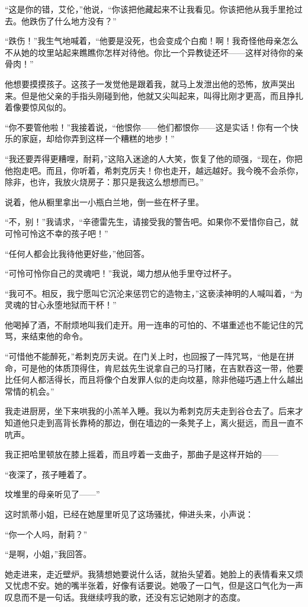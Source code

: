 \par “这是你的错，艾伦，”他说，“你该把他藏起来不让我看见。你该把他从我手里抢过去。他跌伤了什么地方没有？”
\par “跌伤！”我生气地喊着，“他要是没死，也会变成个白痴！啊！我奇怪他母亲怎么不从她的坟里站起来瞧瞧你怎样对待他。你比一个异教徒还坏——这样对待你的亲骨肉！”
\par 他想要摸摸孩子。这孩子一发觉他是跟着我，就马上发泄出他的恐怖，放声哭出来。但是他父亲的手指头刚碰到他，他就又尖叫起来，叫得比刚才更高，而且挣扎着像要惊风似的。
\par “你不要管他啦！”我接着说，“他恨你——他们都恨你——这是实话！你有一个快乐的家庭，却给你弄到这样一个糟糕的地步！”
\par “我还要弄得更糟哩，耐莉，”这陷入迷途的人大笑，恢复了他的顽强，“现在，你把他抱走吧。而且，你听着，希刺克厉夫！你也走开，越远越好。我今晚不会杀你，除非，也许，我放火烧房子：那只是我这么想想而已。”
\par 说着，他从橱里拿出一小瓶白兰地，倒一些在杯子里。
\par “不，别！”我请求，“辛德雷先生，请接受我的警告吧。如果你不爱惜你自己，就可怜可怜这不幸的孩子吧！”
\par “任何人都会比我待他更好些，”他回答。
\par “可怜可怜你自己的灵魂吧！”我说，竭力想从他手里夺过杯子。
\par “我可不。相反，我宁愿叫它沉沦来惩罚它的造物主，”这亵渎神明的人喊叫着，“为灵魂的甘心永堕地狱而干杯！”
\par 他喝掉了酒，不耐烦地叫我们走开。用一连串的可怕的、不堪重述也不能记住的咒骂，来结束他的命令。
\par “可惜他不能醉死，”希刺克厉夫说。在门关上时，也回报了一阵咒骂，“他是在拼命，可是他的体质顶得住，肯尼兹先生说拿自己的马打赌，在吉默吞这一带，他要比任何人都活得长，而且将像个白发罪人似的走向坟墓，除非他碰巧遇上什么越出常情的机会。”
\par 我走进厨房，坐下来哄我的小羔羊入睡。我以为希刺克厉夫走到谷仓去了。后来才知道他只走到高背长靠椅的那边，倒在墙边的一条凳子上，离火挺远，而且一直不吭声。
\par 我正把哈里顿放在膝上摇着，而且哼着一支曲子，那曲子是这样开始的——
\par “夜深了，孩子睡着了。
\par 坟堆里的母亲听见了——”
\par 这时凯蒂小姐，已经在她屋里听见了这场骚扰，伸进头来，小声说：
\par “你一个人吗，耐莉？”
\par “是啊，小姐，”我回答。
\par 她走进来，走近壁炉。我猜想她要说什么话，就抬头望着。她脸上的表情看来又烦又忧虑不安。她的嘴半张着，好像有话要说。她吸了一口气，但是这口气化为一声叹息而不是一句话。我继续哼我的歌，还没有忘记她刚才的态度。
